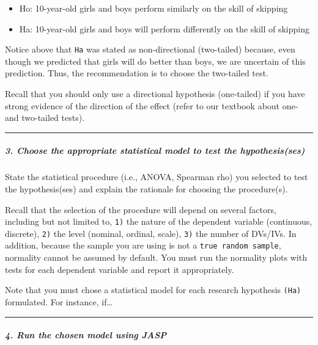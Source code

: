 \documentclass[11pt,]{article}
\providecommand{\tightlist}{%
  \setlength{\itemsep}{0pt}\setlength{\parskip}{0pt}}
\begin{document}
\begin{itemize}
\tightlist
\item
  Ho: 10-year-old girls and boys perform similarly on the skill of
  skipping
\item
  Ha: 10-year-old girls and boys will perform differently on the skill
  of skipping
\end{itemize}

Notice above that \texttt{Ha} was stated as non-directional (two-tailed)
because, even though we predicted that girls will do better than boys,
we are uncertain of this prediction. Thus, the recommendation is to
choose the two-tailed test.

Recall that you should only use a directional hypothesis (one-tailed) if
you have strong evidence of the direction of the effect (refer to our
textbook about one- and two-tailed tests).

\begin{center}\rule{0.5\linewidth}{0.5pt}\end{center}

\hypertarget{choose-the-appropriate-statistical-model-to-test-the-hypothesisses}{%
\subparagraph{3. Choose the appropriate statistical model to test the
hypothesis(ses)}\label{choose-the-appropriate-statistical-model-to-test-the-hypothesisses}}

State the statistical procedure (i.e., ANOVA, Spearman rho) you selected
to test the hypothesis(ses) and explain the rationale for choosing the
procedure(s).

Recall that the selection of the procedure will depend on several
factors, including but not limited to, \texttt{1)} the nature of the
dependent variable (continuous, discrete), \texttt{2)} the level
(nominal, ordinal, scale), \texttt{3)} the number of DVs/IVs. In
addition, because the sample you are using is not a
\texttt{true\ random\ sample}, normality cannot be assumed by default.
You must run the normality plots with tests for each dependent variable
and report it appropriately.

Note that you must chose a statistical model for each research
hypothesis \texttt{(Ha)} formulated. For instance, if\ldots{}

\begin{center}\rule{0.5\linewidth}{0.5pt}\end{center}

\hypertarget{run-the-chosen-model-using-jasp}{%
\subparagraph{4. Run the chosen model using
JASP}\label{run-the-chosen-model-using-jasp}}
\end{document}
